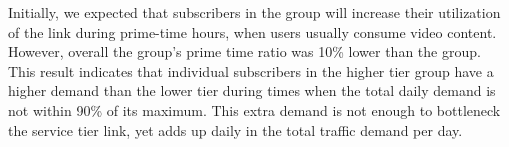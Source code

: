 Initially, we expected that subscribers in the \treatment{} group will increase
their utilization of the link during prime-time hours, when users usually consume video
content. However, overall the \treatment{} group's prime time ratio was 10\% lower than the 
\control{} group. This result indicates that individual subscribers in the higher tier group
have a higher demand than the lower tier during times when the total daily demand is
not within 90\% of its maximum. This extra demand is not enough to bottleneck the service
tier link, yet adds up daily in the total traffic demand per day.


